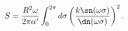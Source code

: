 \begin{equation}
S = \frac{R^2\omega}{2\pi\alpha'}\int_0^{2\pi}d\sigma 
\left(\frac{k\sn(\omega\sigma)}{\dn(\omega\sigma)}\right)^2.
\label{spi}\end{equation}

